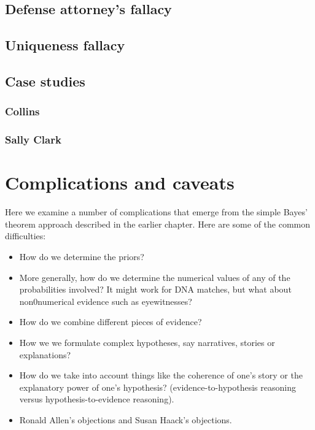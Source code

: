 \documentclass[]{book}
\begin{document}
\section{Defense attorney's fallacy}

\section{Uniqueness fallacy}

\section{Case studies}

\subsection{Collins}

\subsection{Sally Clark}

\chapter{Complications and caveats}


Here we examine a number of complications that
emerge from the simple Bayes' theorem approach
described in the earlier chapter. Here are some of the common difficulties:

\begin{itemize}
 
 \item How do we determine the priors?
 
 \item More generally, how do we determine the numerical 
 values of any of the probabilities involved? 
 It might work for DNA matches, but what about non0numerical evidence 
 such as eyewitnesses? 
 
 \item How do we combine different pieces of evidence?  
 
 \item How we we formulate complex hypotheses, 
 say narratives, stories or explanations? 
 
 \item How do we take into account things 
 like the coherence of one's story or 
 the explanatory power of one's hypothesis?
 (evidence-to-hypothesis reasoning 
 versus hypothesis-to-evidence reasoning).
 
 \item Ronald Allen's objections 
 and Susan Haack's objections. 
 
 \end{itemize}
\end{document}
